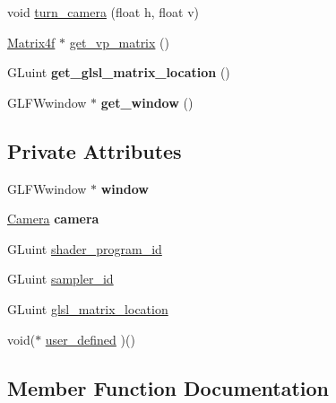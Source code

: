 \begin{DoxyCompactItemize}
\item 
void \mbox{\hyperlink{classagl_1_1Graphics_a0dad176d86f738aac92182f6212c1a5a}{turn\+\_\+camera}} (float h, float v)
\item 
\mbox{\hyperlink{classagl_1_1Matrix4f}{Matrix4f}} $\ast$ \mbox{\hyperlink{classagl_1_1Graphics_a7b7547d0fece7b39a3c22e88ed39877d}{get\+\_\+vp\+\_\+matrix}} ()
\item 
\mbox{\label{classagl_1_1Graphics_a1de3ba49915776ce380d2cef5a0f5fd4}} 
G\+Luint {\bfseries get\+\_\+glsl\+\_\+matrix\+\_\+location} ()
\item 
\mbox{\label{classagl_1_1Graphics_a1ac758c41d7589c36cb0a895e7968988}} 
G\+L\+F\+Wwindow $\ast$ {\bfseries get\+\_\+window} ()
\end{DoxyCompactItemize}
\subsection*{Private Attributes}
\begin{DoxyCompactItemize}
\item 
\mbox{\label{classagl_1_1Graphics_aafd278cd34a4f7bfa1f9a43a30a0013d}} 
G\+L\+F\+Wwindow $\ast$ {\bfseries window}
\item 
\mbox{\label{classagl_1_1Graphics_a62fa65c548fb1342aec7ca3f87076169}} 
\mbox{\hyperlink{classagl_1_1Camera}{Camera}} {\bfseries camera}
\item 
G\+Luint \mbox{\hyperlink{classagl_1_1Graphics_a26482480b230df75339ee3c4d590aae5}{shader\+\_\+program\+\_\+id}}
\item 
G\+Luint \mbox{\hyperlink{classagl_1_1Graphics_a82ac17a72cd256e354f0587e1107b6ce}{sampler\+\_\+id}}
\item 
G\+Luint \mbox{\hyperlink{classagl_1_1Graphics_a3550ce001ca87a37911808dcf2b41757}{glsl\+\_\+matrix\+\_\+location}}
\item 
void($\ast$ \mbox{\hyperlink{classagl_1_1Graphics_aaf660bd9fd1b06652b05f7a7ef3e6fcb}{user\+\_\+defined}} )()
\end{DoxyCompactItemize}


\subsection{Member Function Documentation}
\mbox{\label{classagl_1_1Graphics_a7b7547d0fece7b39a3c22e88ed39877d}} 
